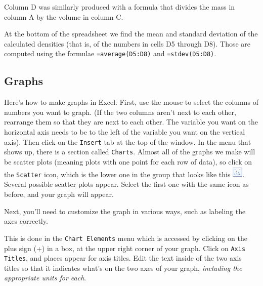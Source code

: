 Column D was similarly produced with a formula that divides the
mass in column A by the volume in column C.

At the bottom of the spreadsheet we find the mean and standard
deviation of the calculated densities (that is, of the numbers
in cells D5 through D8).  Those are computed
using the formulae {\tt =average(D5:D8)} and {\tt =stdev(D5:D8)}.




\subsection{Graphs}

Here's how to make graphs in Excel.  First, use the mouse
to select the columns of numbers you want to graph.  (If the two
columns aren't next to each other, rearrange them so that they are next to 
each other. The variable you want on the horizontal axis needs to be to the 
left of the variable you want on the vertical axis).
Then click on the {\tt Insert} tab at the top of the window.
In the menu that shows up, there is a section called {\tt Charts}.
Almost all of the graphs we make will be scatter plots (meaning plots
with one point for each row of data), so click on the {\tt Scatter} icon, 
which is the lower one in the group that looks like this  
\includegraphics[width=0.2in]{appendices/excel/excelfigs/scatterplot.eps}.  
Several possible scatter plots appear. Select the 
first one with the same icon as before, and your graph will appear.
\vspace{0.5cm}

Next, you'll need to customize the graph in various ways, such
as labeling the axes correctly.  
\vspace{0.5cm}

This is done in the {\tt Chart Elements} menu which is accessed by clicking 
on the plus sign (+) in a box, at the upper right corner of your graph. Click 
on {\tt Axis Titles}, and places appear for axis titles. Edit the text inside 
of the two axis titles so that it indicates what's on the two axes of your 
graph, {\it including the appropriate units for each}.
\vspace{0.5cm}


